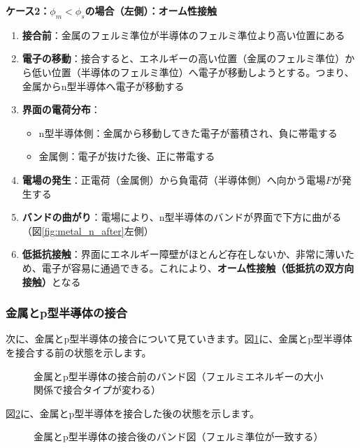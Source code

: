 \textbf{ケース2：$\phi_m < \phi_s$の場合（左側）：オーム性接触}

\begin{enumerate}
\item \textbf{接合前}：金属のフェルミ準位が半導体のフェルミ準位より高い位置にある

\item \textbf{電子の移動}：接合すると、エネルギーの高い位置（金属のフェルミ準位）から低い位置（半導体のフェルミ準位）へ電子が移動しようとする。つまり、金属からn型半導体へ電子が移動する

\item \textbf{界面の電荷分布}：
\begin{itemize}
\item n型半導体側：金属から移動してきた電子が蓄積され、負に帯電する
\item 金属側：電子が抜けた後、正に帯電する
\end{itemize}

\item \textbf{電場の発生}：正電荷（金属側）から負電荷（半導体側）へ向かう電場$F$が発生する

\item \textbf{バンドの曲がり}：電場により、n型半導体のバンドが界面で下方に曲がる（図\ref{fig:metal_n_after}左側）

\item \textbf{低抵抗接触}：界面にエネルギー障壁がほとんど存在しないか、非常に薄いため、電子が容易に通過できる。これにより、\textbf{オーム性接触（低抵抗の双方向接触）}となる
\end{enumerate}

\subsubsection{金属とp型半導体の接合}

次に、金属とp型半導体の接合について見ていきます。図\ref{fig:metal_p_before}に、金属とp型半導体を接合する前の状態を示します。

\begin{figure}[H]
\centering
{}
\caption{金属とp型半導体の接合前のバンド図（フェルミエネルギーの大小関係で接合タイプが変わる）}
\label{fig:metal_p_before}
\end{figure}

図\ref{fig:metal_p_after}に、金属とp型半導体を接合した後の状態を示します。

\begin{figure}[H]
\centering
{}
\caption{金属とp型半導体の接合後のバンド図（フェルミ準位が一致する）}
\label{fig:metal_p_after}
\end{figure}

